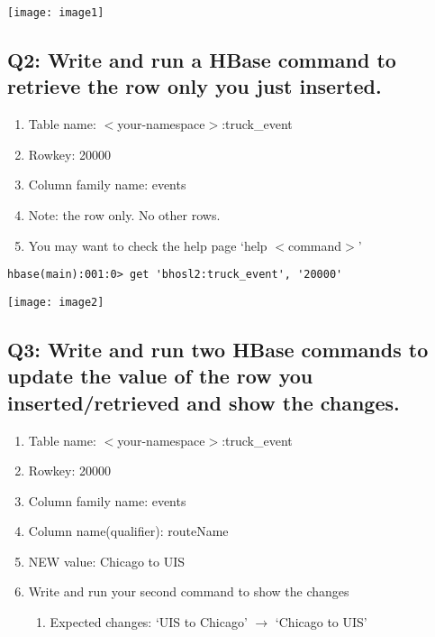 \documentclass[]{article}
\begin{document}
\texttt{[image: image1]} %

\subsection*{Q2: Write and run a HBase command to retrieve the row only you just inserted.} 
\begin{enumerate}[before=\itshape,font=\normalfont,label=\alph*.]
	\item Table name: $<$your-namespace$>$:truck\_event
	\item Rowkey: 20000
	\item Column family name: events
	\item Note: the row only. No other rows.
	\item You may want to check the help page ‘help $<$command$>$’
\end{enumerate}

\begin{verbatim}
hbase(main):001:0> get 'bhosl2:truck_event', '20000'
\end{verbatim}

\texttt{[image: image2]} %

\clearpage

\subsection*{Q3: Write and run two HBase commands to update the value of the row you inserted/retrieved and show the changes.} 
\begin{enumerate}[before=\itshape,font=\normalfont,label=\alph*.]
	\item Table name: $<$your-namespace$>$:truck\_event
	\item Rowkey: 20000
	\item Column family name: events
	\item Column name(qualifier): routeName
	\item NEW value: Chicago to UIS
	\item Write and run your second command to show the changes
	\begin{enumerate}[label=\roman*.]
		\item Expected changes: ‘UIS to Chicago’ $\rightarrow$ ‘Chicago to UIS’
	\end{enumerate}
\end{enumerate}
\end{document}
